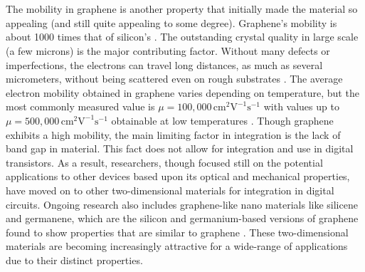 \documentclass[%
 reprint,
 amsmath,amssymb,
 aps,
pra,
floatfix,
]{revtex4-1}
\begin{document}
\\ \\
The mobility in graphene is another property that initially made the material so appealing (and still quite appealing to some degree). Graphene's mobility is about 1000 times that of silicon's \cite{Dargys1994, 2DflexibleNanoElectronics2014}. The outstanding crystal quality in large scale (a few microns) is the major contributing factor. Without many defects or imperfections, the electrons can travel long distances, as much as several micrometers, without being scattered even on rough substrates \cite{nanoscaleReview2011, Du2008}. The average electron mobility obtained in graphene varies depending on temperature, but the most commonly measured value is $\mu = 100,000\mathrm{\,cm}^2\mathrm{V}^{-1}\mathrm{s}^{-1}$ with values up to $\mu = 500,000\mathrm{\,cm}^2\mathrm{V}^{-1}\mathrm{s}^{-1}$ obtainable at low temperatures \cite{vanderWaalsHeterostruct2013}. Though graphene exhibits a high mobility, the main limiting factor in integration is the lack of band gap in material. This fact does not allow for integration and use in digital transistors. As a result, researchers, though focused still on the potential applications to other devices based upon its optical and mechanical properties, have moved on to other two-dimensional materials for integration in digital circuits. Ongoing research also includes graphene-like nano materials like silicene and germanene, which are the silicon and germanium-based versions of graphene found to show properties that are similar to graphene \cite{Takeda1994, Cahangirov2009}. These two-dimensional materials are becoming increasingly attractive for a wide-range of applications due to their distinct properties.
\end{document}
